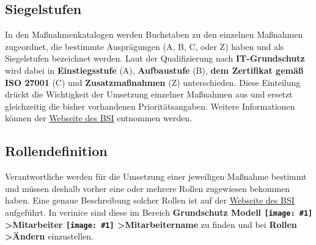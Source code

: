 \documentclass[a4paper,10pt]{book}
\newcommand{\icon}[1]{\texttt{[image: \#1]}}
\begin{document}
\subsection{Siegelstufen}
In den Maßnahmenkatalogen werden Buchstaben zu den einzelnen Maßnahmen zugeordnet, die bestimmte Ausprägungen (A, B, C, oder Z)
haben und als Siegelstufen bezeichnet werden. Laut der Qualifizierung nach \textbf{IT-Grundschutz} wird dabei in
\textbf{Einstiegsstufe} (A), \textbf{Aufbaustufe} (B), \textbf{dem Zertifikat gemäß ISO 27001} (C) und \textbf{Zusatzmaßnahmen} (Z) unterschieden.
Diese Einteilung drückt die Wichtigkeit der Umsetzung einzelner Maßnahmen aus und ersetzt gleichzeitig die bisher vorhandenen
Prioritätsangaben. Weitere Informationen können der
\href{https://www.bsi.bund.de/cln_156/DE/Themen/weitereThemen/ITGrundschutzSchulung/NeuesimITGrundschutz/LebenszyklusundSiegelstufen/lebenszyklusundsiegelstufen_node.html}{Webseite des BSI} entnommen werden.

\subsection{Rollendefinition}
Verantwortliche werden für die Umsetzung einer jeweiligen Maßnahme bestimmt und müssen deshalb vorher eine oder mehrere Rollen
zugewiesen bekommen haben. Eine genaue Beschreibung solcher Rollen ist auf der
\href{https://www.bsi.bund.de/cln_156/DE/Themen/weitereThemen/ITGrundschutzKataloge/Inhalt/Rollendefinitionen/rollendefinitionen_node.html}{Webseite des BSI} aufgeführt.
In verinice sind diese im Bereich \textbf{Grundschutz Modell \icon{Icon/GS_Modell.png} \textgreater Mitarbeiter \icon{Icon/Mitarbeiter.png} \textgreater  Mitarbeitername}
zu finden und bei \textbf{Rollen \textgreater Ändern} einzustellen.
\end{document}
